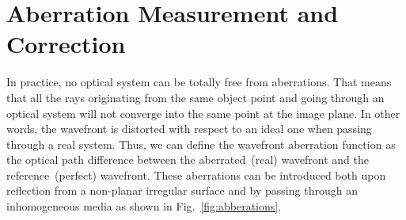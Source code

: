 \section{Aberration Measurement and Correction}
\label{Measurement}


In practice, no optical system can be totally free from aberrations. That means that all the rays originating from the same object point and going through an optical system will not converge into the same point at the image plane. In other words, the wavefront is distorted with respect to an ideal one when passing through a real system. Thus, we can define the wavefront aberration function as the optical path difference between the aberrated~(real) wavefront and the reference~(perfect) wavefront. These aberrations can be introduced both upon reflection from a non-planar irregular surface and by passing through an inhomogeneous media as shown in Fig.~\ref{fig:abberations}. 


